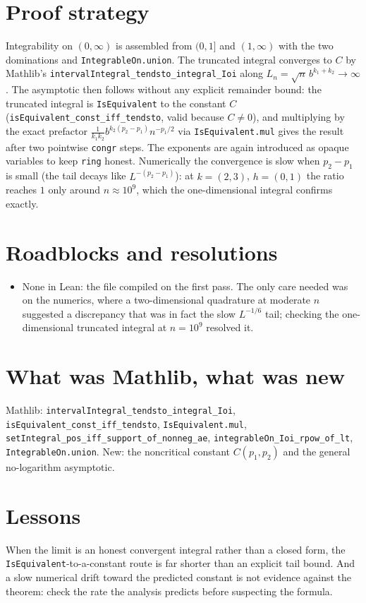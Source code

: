 \documentclass[11pt]{article}
\begin{document}
\section{Proof strategy}
Integrability on $(0,\infty)$ is assembled from $(0,1]$ and $(1,\infty)$ with the two dominations
and \texttt{IntegrableOn.union}. The truncated integral converges to $C$ by Mathlib's
\texttt{intervalIntegral\_tendsto\_integral\_Ioi} along $L_n=\sqrt n\,b^{k_1+k_2}\to\infty$. The
asymptotic then follows without any explicit remainder bound: the truncated integral is
\texttt{IsEquivalent} to the constant $C$ (\texttt{isEquivalent\_const\_iff\_tendsto}, valid because
$C\ne0$), and multiplying by the exact prefactor $\tfrac1{k_1k_2}b^{k_2(p_2-p_1)}n^{-p_1/2}$ via
\texttt{IsEquivalent.mul} gives the result after two pointwise \texttt{congr} steps. The
exponents are again introduced as opaque variables to keep \texttt{ring} honest. Numerically the
convergence is slow when $p_2-p_1$ is small (the tail decays like $L^{-(p_2-p_1)}$): at $k=(2,3)$,
$h=(0,1)$ the ratio reaches $1$ only around $n\approx10^9$, which the one-dimensional integral
confirms exactly.

\section{Roadblocks and resolutions}
\begin{itemize}
\item None in Lean: the file compiled on the first pass. The only care needed was on the numerics,
where a two-dimensional quadrature at moderate $n$ suggested a discrepancy that was in fact the
slow $L^{-1/6}$ tail; checking the one-dimensional truncated integral at $n=10^9$ resolved it.
\end{itemize}

\section{What was Mathlib, what was new}
Mathlib: \texttt{intervalIntegral\_tendsto\_integral\_Ioi}, \texttt{isEquivalent\_const\_iff\_tendsto},
\texttt{IsEquivalent.mul}, \texttt{setIntegral\_pos\_iff\_support\_of\_nonneg\_ae},
\texttt{integrableOn\_Ioi\_rpow\_of\_lt}, \texttt{IntegrableOn.union}. New: the noncritical constant
$C(p_1,p_2)$ and the general no-logarithm asymptotic.

\section{Lessons}
When the limit is an honest convergent integral rather than a closed form, the
\texttt{IsEquivalent}-to-a-constant route is far shorter than an explicit tail bound. And a slow
numerical drift toward the predicted constant is not evidence against the theorem: check the rate
the analysis predicts before suspecting the formula.
\end{document}
